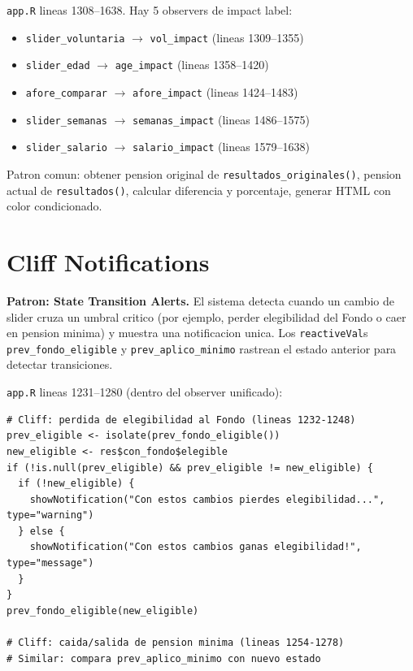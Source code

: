 \documentclass[11pt, letterpaper, twoside]{report}
\begin{document}
\begin{codigobox}
\texttt{app.R} lineas 1308--1638. Hay 5 observers de impact label:
\begin{itemize}[nosep]
\item \texttt{slider\_voluntaria} $\to$ \texttt{vol\_impact} (lineas 1309--1355)
\item \texttt{slider\_edad} $\to$ \texttt{age\_impact} (lineas 1358--1420)
\item \texttt{afore\_comparar} $\to$ \texttt{afore\_impact} (lineas 1424--1483)
\item \texttt{slider\_semanas} $\to$ \texttt{semanas\_impact} (lineas 1486--1575)
\item \texttt{slider\_salario} $\to$ \texttt{salario\_impact} (lineas 1579--1638)
\end{itemize}
Patron comun: obtener pension original de \texttt{resultados\_originales()},
pension actual de \texttt{resultados()}, calcular diferencia y porcentaje,
generar HTML con color condicionado.
\end{codigobox}


\section{Cliff Notifications}
\label{sec:cliff}

\begin{patronbox}
\textbf{Patron: State Transition Alerts.} El sistema detecta cuando un cambio
de slider cruza un umbral critico (por ejemplo, perder elegibilidad del Fondo o
caer en pension minima) y muestra una notificacion unica. Los
\texttt{reactiveVal}s \texttt{prev\_fondo\_eligible} y \texttt{prev\_aplico\_minimo}
rastrean el estado anterior para detectar transiciones.
\end{patronbox}

\begin{codigobox}
\texttt{app.R} lineas 1231--1280 (dentro del observer unificado):
\begin{lstlisting}[caption={Deteccion de cliff notifications}]
# Cliff: perdida de elegibilidad al Fondo (lineas 1232-1248)
prev_eligible <- isolate(prev_fondo_eligible())
new_eligible <- res$con_fondo$elegible
if (!is.null(prev_eligible) && prev_eligible != new_eligible) {
  if (!new_eligible) {
    showNotification("Con estos cambios pierdes elegibilidad...", type="warning")
  } else {
    showNotification("Con estos cambios ganas elegibilidad!", type="message")
  }
}
prev_fondo_eligible(new_eligible)

# Cliff: caida/salida de pension minima (lineas 1254-1278)
# Similar: compara prev_aplico_minimo con nuevo estado
\end{lstlisting}
\end{codigobox}
\end{document}
